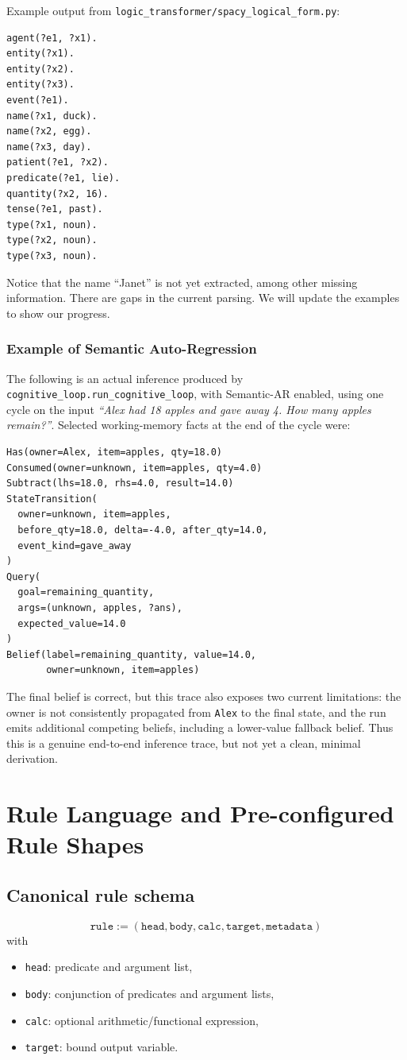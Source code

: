\documentclass[14pt]{article}
\begin{document}
Example output from \texttt{logic\_transformer/spacy\_logical\_form.py}:
\begin{verbatim}
agent(?e1, ?x1).
entity(?x1).
entity(?x2).
entity(?x3).
event(?e1).
name(?x1, duck).
name(?x2, egg).
name(?x3, day).
patient(?e1, ?x2).
predicate(?e1, lie).
quantity(?x2, 16).
tense(?e1, past).
type(?x1, noun).
type(?x2, noun).
type(?x3, noun).
\end{verbatim}

Notice that the name ``Janet'' is not yet extracted, among other missing information.  There are gaps in the current parsing.  We will update the examples to show our progress.

\subsubsection{Example of Semantic Auto-Regression}

The following is an actual inference produced by
\texttt{cognitive\_loop.run\_cognitive\_loop}, with Semantic-AR enabled, using one
cycle on the input
\textit{``Alex had 18 apples and gave away 4. How many apples remain?''}.
Selected working-memory facts at the end of the cycle were:
\begin{verbatim}
Has(owner=Alex, item=apples, qty=18.0)
Consumed(owner=unknown, item=apples, qty=4.0)
Subtract(lhs=18.0, rhs=4.0, result=14.0)
StateTransition(
  owner=unknown, item=apples,
  before_qty=18.0, delta=-4.0, after_qty=14.0,
  event_kind=gave_away
)
Query(
  goal=remaining_quantity,
  args=(unknown, apples, ?ans),
  expected_value=14.0
)
Belief(label=remaining_quantity, value=14.0,
       owner=unknown, item=apples)
\end{verbatim}

The final belief is correct, but this trace also exposes two current limitations:
the owner is not consistently propagated from \texttt{Alex} to the final state,
and the run emits additional competing beliefs, including a lower-value fallback
belief.  Thus this is a genuine end-to-end inference trace, but not yet a clean,
minimal derivation.

\section{Rule Language and Pre-configured Rule Shapes}

\subsection{Canonical rule schema}
\[
\texttt{rule} := (\texttt{head}, \texttt{body}, \texttt{calc}, \texttt{target}, \texttt{metadata})
\]
with
\begin{itemize}[leftmargin=1.5em]
  \item \texttt{head}: predicate and argument list,
  \item \texttt{body}: conjunction of predicates and argument lists,
  \item \texttt{calc}: optional arithmetic/functional expression,
  \item \texttt{target}: bound output variable.
\end{itemize}
\end{document}
